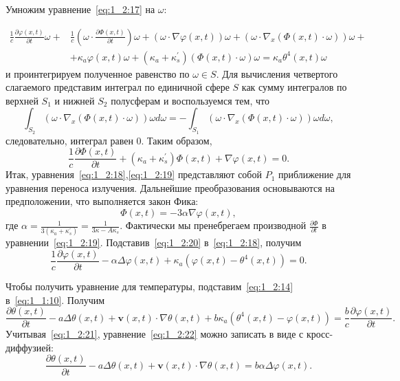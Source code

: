 Умножим уравнение~\eqref{eq:1_2:17} на $\omega:$

\[
    \begin{aligned}
        \frac{1}{c} \frac{\partial \varphi(x, t)}{\partial t} \omega+&
        \frac{1}{c}\left(\omega \cdot \frac{\partial \Phi(x, t)}{\partial t}\right)
        \omega+(\omega \cdot \nabla \varphi(x, t)) \omega
        +\left(\omega \cdot \nabla_{x}(\Phi(x, t)
        \cdot \omega)\right) \omega+\\
        &+\kappa_{a} \varphi(x, t) \omega+\left(\kappa_{a}
        +\kappa_{s}^{\prime}\right)(\Phi(x, t)
        \cdot \omega) \omega=\kappa_{a} \theta^{4}(x, t) \omega
    \end{aligned}
\]
и проинтегрируем полученное равенство по $\omega \in S$.
Для вычисления четвертого слагаемого представим интеграл по единичной сфере $S$
как сумму интегралов по верхней $S_{1}$ и нижней $S_{2}$ полусферам и воспользуемся тем, что
\[
    \int_{S_{2}}\left(\omega \cdot \nabla_{x}(\Phi(x, t)
    \cdot \omega)\right) \omega d
    \omega=-\int_{S_{1}}\left(\omega \cdot \nabla_{x}(\Phi(x, t)
    \cdot \omega)\right) \omega d \omega,
\]
следовательно, интеграл равен 0.
Таким образом,
\begin{equation}
    \label{eq:1_2:19}
    \frac{1}{c} \frac{\partial \Phi(x, t)}{\partial t}
    + \left(\kappa_{a}+\kappa_{s}^{\prime}\right)
    \Phi(x, t)+\nabla \varphi(x, t)=0.
\end{equation}
Итак, уравнения~\eqref{eq:1_2:18},\eqref{eq:1_2:19}
представляют собой $P_{1}$ приближение
для уравнения переноса излучения.
Дальнейшие преобразования основываются на предположении, что выполняется закон Фика:
\begin{equation}
    \label{eq:1_2:20}
    \Phi(x, t)=-3 \alpha \nabla \varphi(x, t),
\end{equation}
где $\alpha=\frac{1}{3\left(\kappa_{a}+\kappa_{s}^{\prime}\right)}
=\frac{1}{3 \kappa-A \kappa_{s}}$.
Фактически мы пренебрегаем производной
$\frac{\partial \Phi}{\partial t}$ в уравнении~\eqref{eq:1_2:19}.
Подставив~\eqref{eq:1_2:20} в~\eqref{eq:1_2:18}, получим
\begin{equation}
    \label{eq:1_2:21}
    \frac{1}{c} \frac{\partial \varphi(x, t)}{\partial t}-\alpha \Delta
    \varphi(x, t)+\kappa_{a}\left(\varphi(x, t)-\theta^{4}(x, t)\right)=0.
\end{equation}


Чтобы получить уравнение для температуры, подставим~\eqref{eq:1_2:14} в~\eqref{eq:1_1:10}.
Получим
\begin{equation}
    \label{eq:1_2:22}
    \frac{\partial \theta(x, t)}{\partial t}-a \Delta \theta(x, t)+\mathbf{v}(x, t) \cdot
    \nabla \theta(x, t)+b \kappa_{a}\left(\theta^{4}(x, t)-\varphi(x, t)\right)=\frac{b}{c}
    \frac{\partial \varphi(x, t)}{\partial t}.
\end{equation}
Учитывая~\eqref{eq:1_2:21}, уравнение~\eqref{eq:1_2:22} можно записать в виде с кросс-диффузией:
\[
    \frac{\partial \theta(x, t)}{\partial t}-a \Delta \theta(x, t)+\mathbf{v}(x, t) \cdot
    \nabla \theta(x, t)=b \alpha \Delta \varphi(x, t).
\]


